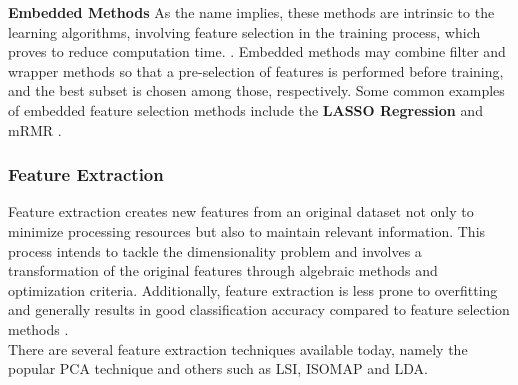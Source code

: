 \begin{description}
\item \textbf{Embedded Methods}
As the name implies, these methods are intrinsic to the learning algorithms, involving feature selection in the training process, which proves to reduce computation time. \cite{featureSelection_embedded}. Embedded methods may combine filter and wrapper methods so that a pre-selection of features is performed before training, and the best subset is chosen among those, respectively.
Some common examples of embedded feature selection methods include the \textbf{LASSO Regression} \cite{featureSelectionWithApplications} and \gls{mRMR} \cite{featureSelection_embedded}.

\end{description}

\subsubsection{Feature Extraction}
\label{subsec:featureExtraction}

Feature extraction creates new features from an original dataset not only to minimize processing resources but also to maintain relevant information. This process intends to tackle the dimensionality problem and involves a transformation of the original features through algebraic methods and optimization criteria. Additionally, feature extraction is less prone to overfitting and generally results in good classification accuracy compared to feature selection methods \cite{comprehensiveReviewFeatureExtraction}.\\

There are several feature extraction techniques available today, namely the popular \gls{PCA} technique and others such as \gls{LSI}, \gls{ISOMAP} and \gls{LDA}.


